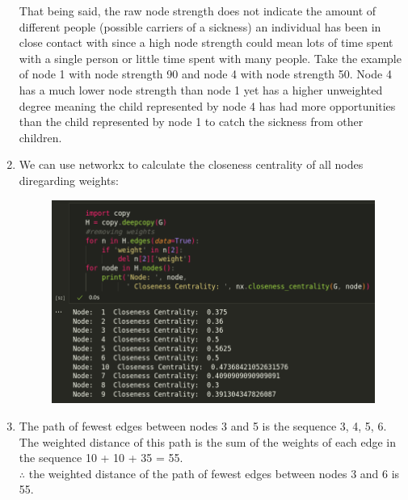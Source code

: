 \documentclass{article}
\begin{document}
\begin{enumerate}[label=(\alph*), left=10pt, itemsep=10pt]
\begin{minipage}[t]{0.9\textwidth}
            That being said, the raw node strength does not indicate the amount
            of different people (possible carriers of a sickness) an
            individual has been in close contact with since
            a high node strength could mean lots of time spent with a single
            person or little time spent with many people. Take the example of
            node 1 with node strength 90 and node 4 with node strength 50. Node
            4 has a much lower node strength than node 1 yet has a higher
            unweighted degree meaning the child represented by node 4 has
            had more opportunities than the child represented by node 1 to catch
            the sickness from other children.  
        \end{minipage}

        \item \begin{minipage}[t]{0.9\textwidth}
            We can use networkx to calculate the closeness centrality of all nodes diregarding weights:
            \begin{figure}[H]
                \centering
                \includegraphics[width=1\textwidth, height=0.3\textheight]{./1d.png}
            \end{figure}
        \end{minipage}

        \item \begin{minipage}[t]{0.9\textwidth}
            The path of fewest edges between nodes 3 and 5 is the sequence 3, 4, 5, 6. The weighted distance of
            this path is the sum of the weights of each edge in the sequence 10 + 10 + 35 = 55.\\
            $\therefore$ the weighted distance of the path of fewest edges between nodes 3 and 6 is 55.
        \end{minipage}


\end{enumerate}
\end{document}
